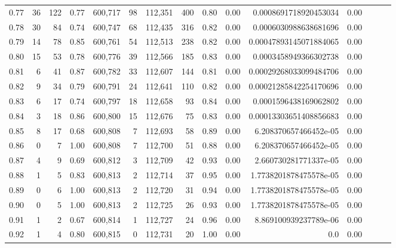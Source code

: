 \begin{tabular}{rrrrrrrrrrrrrrr}
0.77 &      36 &    122 &  0.77 &  600,717 &       98 &  112,351 &      400 &  0.80 &  0.00 &   0.0008691718920453034 &      0.00 \\
0.78 &      30 &     84 &  0.74 &  600,747 &       68 &  112,435 &      316 &  0.82 &  0.00 &   0.0006030988638681696 &      0.00 \\
0.79 &      14 &     78 &  0.85 &  600,761 &       54 &  112,513 &      238 &  0.82 &  0.00 &  0.00047893145071884065 &      0.00 \\
0.80 &      15 &     53 &  0.78 &  600,776 &       39 &  112,566 &      185 &  0.83 &  0.00 &   0.0003458949366302738 &      0.00 \\
0.81 &       6 &     41 &  0.87 &  600,782 &       33 &  112,607 &      144 &  0.81 &  0.00 &  0.00029268033099484706 &      0.00 \\
0.82 &       9 &     34 &  0.79 &  600,791 &       24 &  112,641 &      110 &  0.82 &  0.00 &  0.00021285842254170696 &      0.00 \\
0.83 &       6 &     17 &  0.74 &  600,797 &       18 &  112,658 &       93 &  0.84 &  0.00 &   0.0001596438169062802 &      0.00 \\
0.84 &       3 &     18 &  0.86 &  600,800 &       15 &  112,676 &       75 &  0.83 &  0.00 &  0.00013303651408856683 &      0.00 \\
0.85 &       8 &     17 &  0.68 &  600,808 &        7 &  112,693 &       58 &  0.89 &  0.00 &   6.208370657466452e-05 &      0.00 \\
0.86 &       0 &      7 &  1.00 &  600,808 &        7 &  112,700 &       51 &  0.88 &  0.00 &   6.208370657466452e-05 &      0.00 \\
0.87 &       4 &      9 &  0.69 &  600,812 &        3 &  112,709 &       42 &  0.93 &  0.00 &   2.660730281771337e-05 &      0.00 \\
0.88 &       1 &      5 &  0.83 &  600,813 &        2 &  112,714 &       37 &  0.95 &  0.00 &  1.7738201878475578e-05 &      0.00 \\
0.89 &       0 &      6 &  1.00 &  600,813 &        2 &  112,720 &       31 &  0.94 &  0.00 &  1.7738201878475578e-05 &      0.00 \\
0.90 &       0 &      5 &  1.00 &  600,813 &        2 &  112,725 &       26 &  0.93 &  0.00 &  1.7738201878475578e-05 &      0.00 \\
0.91 &       1 &      2 &  0.67 &  600,814 &        1 &  112,727 &       24 &  0.96 &  0.00 &   8.869100939237789e-06 &      0.00 \\
0.92 &       1 &      4 &  0.80 &  600,815 &        0 &  112,731 &       20 &  1.00 &  0.00 &                     0.0 &      0.00 \\

\end{tabular}
